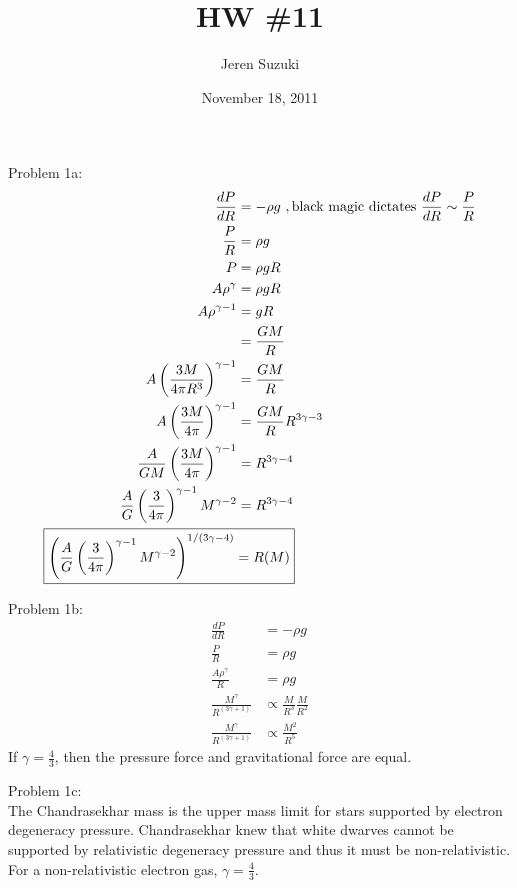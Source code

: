 \documentclass[10pt,letter,preprint]{aastex}
\newcommand{\pt}{\propto}
\newcommand{\rp}{\right)}
\newcommand{\lp}{\left(}
\begin{document}
\title{HW \#11}
\author{\begin{large}Jeren Suzuki\end{large}}
\author{November 18, 2011}

Problem 1a:\\
\begin{align}
\frac{dP}{dR} &= -\rho g~,\textrm{black magic dictates }\frac{dP}{dR} \sim \frac{P}{R}\\
\frac{P}{R} &= \rho g\\
P &= \rho g R\\
A \rho^{\gamma} &= \rho gR\\
A \rho^{\gamma-1}&= gR\\
&= \frac{GM}{R}\\
A \lp \frac{3M}{4 \pi R^3} \rp^{\gamma-1} &= \frac{GM}{R}\\
A \lp \frac{3M}{4 \pi} \rp^{\gamma-1} &= \frac{GM}{R}R^{3\gamma - 3}\\
\frac{A}{GM}\lp \frac{3M}{4 \pi} \rp^{\gamma-1} &= R^{3\gamma-4}\\
\frac{A}{G} \lp \frac{3}{4\pi} \rp^{\gamma-1} M^{\gamma-2} &= R^{3\gamma-4}\\
\Aboxed{\lp \frac{A}{G} \lp \frac{3}{4\pi} \rp^{\gamma-1} M^{\gamma-2}  \rp ^{1/{(3\gamma -4)}} &= R(M)}
\end{align}

Problem 1b:\\
\begin{align}
\frac{dP}{dR} &= -\rho g\\
\frac{P}{R} &= \rho g\\
\frac{A\rho^\gamma}{R} &= \rho g\\
\frac{M^\gamma}{R^{(3\gamma+1)}}&\pt \frac{M}{R^3}\frac{M}{R^2}\\
\frac{M^\gamma}{R^{(3\gamma+1)}}&\pt \frac{M^2}{R^5} 
\end{align}
If $\gamma=\frac{4}{3}$, then the pressure force and gravitational force are equal. 

Problem 1c:\\
The Chandrasekhar mass is the upper mass limit for stars supported by electron degeneracy pressure. Chandrasekhar knew that white dwarves cannot be supported by relativistic degeneracy pressure and thus it must be non-relativistic. For a non-relativistic electron gas, $\gamma = \frac{4}{3}$. 
\end{document}
